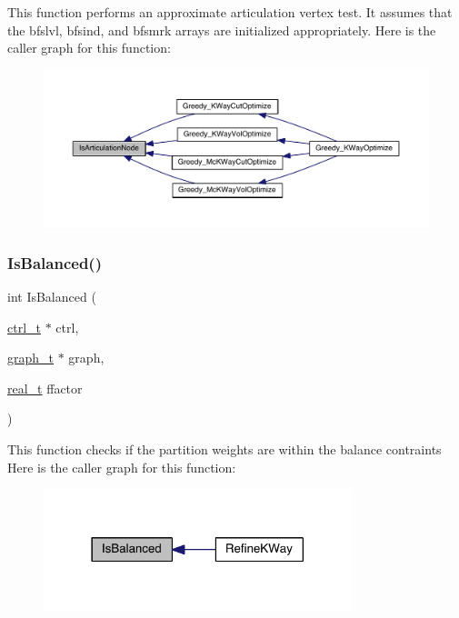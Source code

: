 This function performs an approximate articulation vertex test. It assumes that the bfslvl, bfsind, and bfsmrk arrays are initialized appropriately. Here is the caller graph for this function\+:\nopagebreak
\begin{figure}[H]
\begin{center}
\leavevmode
\includegraphics[width=350pt]{a00945_af791bf8cc50b3b218224e0560decc422_icgraph}
\end{center}
\end{figure}
\mbox{\label{a00945_ae2f5446999d83461cf5763dc4946182a}} 
\subsubsection{\texorpdfstring{Is\+Balanced()}{IsBalanced()}}
{\footnotesize\ttfamily int Is\+Balanced (\begin{DoxyParamCaption}\item[{\hyperlink{a00742}{ctrl\+\_\+t} $\ast$}]{ctrl,  }\item[{\hyperlink{a00734}{graph\+\_\+t} $\ast$}]{graph,  }\item[{\hyperlink{a00876_a1924a4f6907cc3833213aba1f07fcbe9}{real\+\_\+t}}]{ffactor }\end{DoxyParamCaption})}

This function checks if the partition weights are within the balance contraints Here is the caller graph for this function\+:\nopagebreak
\begin{figure}[H]
\begin{center}
\leavevmode
\includegraphics[width=254pt]{a00945_ae2f5446999d83461cf5763dc4946182a_icgraph}
\end{center}
\end{figure}
\mbox{\label{a00945_a06638e74c8e49f9fb9881b960f8c4f05}} 
